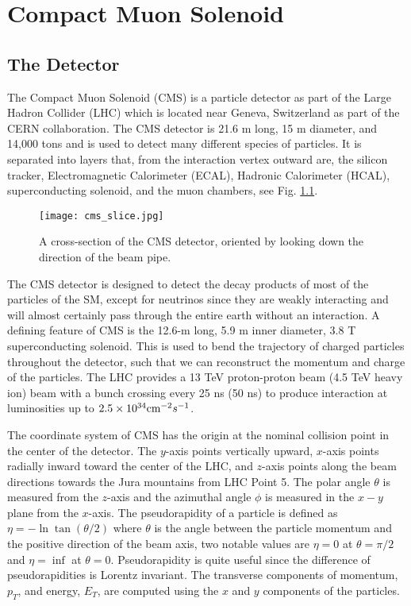 \chapter{Compact Muon Solenoid}
\label{ch:CMS}

\section{The Detector}
\label{sec:cmsIntro}

The Compact Muon Solenoid (CMS) is a particle detector as part of the Large Hadron Collider (LHC) which is located near Geneva, Switzerland as part of the CERN collaboration. The CMS detector is 21.6 m long, 15 m diameter, and 14,000 tons and is used to detect many different species of particles. It is separated into layers that, from the interaction vertex outward are, the silicon tracker, Electromagnetic Calorimeter (ECAL), Hadronic Calorimeter (HCAL), superconducting solenoid, and the muon chambers, see Fig. \ref{CMSSlice}. 

\begin{figure}
 	\centering
	\texttt{[image: cms\_slice.jpg]}
 	\caption[CMS Cross Section]{A cross-section of the CMS detector, oriented by looking down the direction of the beam pipe. }
 	\label{CMSSlice} 
\end{figure}

The CMS detector is designed to detect the decay products of most of the particles of the SM, except for neutrinos since they are weakly interacting and will almost certainly pass through the entire earth without an interaction. A defining feature of CMS is the 12.6-m long, 5.9 m inner diameter, 3.8 T superconducting solenoid. This is used to bend the trajectory of charged particles throughout the detector, such that we can reconstruct the momentum and charge of the particles. The LHC provides a 13 TeV proton-proton beam (4.5 TeV heavy ion) beam with a bunch crossing every 25 ns (50 ns) to produce interaction at luminosities up to $2.5\times10^{34} \text{cm}^{-2}s^{-1}$. 

The coordinate system of CMS has the origin at the nominal collision point in the center of the detector. The $y$-axis points vertically upward, $x$-axis points radially inward toward the center of the LHC, and $z$-axis points along the beam directions towards the Jura mountains from LHC Point 5. The polar angle $\theta$ is measured from the $z$-axis and the azimuthal angle $\phi$ is measured in the $x-y$ plane from the $x$-axis. The pseudorapidity of a particle is defined as $\eta=-\ln\tan(\theta/2)$ where $\theta$ is the angle between the particle momentum and the positive direction of the beam axis, two notable values are $\eta=0$ at $\theta=\pi/2$ and $\eta=\inf$ at $\theta=0$. Pseudorapidity is quite useful since the difference of pseudorapidities is Lorentz invariant. The transverse components of momentum, $p_T$, and energy, $E_T$, are computed using the $x$ and $y$ components of the particles. 

